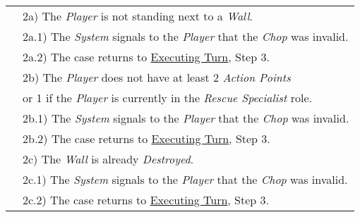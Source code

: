 \documentclass{article}
\begin{document}
	\begin{tabular}{l l}
		&2a) The \textit{Player} is not standing next to a \textit{Wall}.\\
		&\qquad2a.1) The \textit{System} signals to the \textit{Player} that the \textit{Chop} was invalid.\\ 
		&\qquad2a.2) The case returns to \underline{Executing Turn}, Step 3.\\
		&2b) The \textit{Player} does not have at least 2 \textit{Action Points}\\
		&\qquad or 1 if the \textit{Player} is currently in the \textit{Rescue Specialist} role.\\ 
		&\qquad2b.1) The \textit{System} signals to the \textit{Player} that the \textit{Chop} was invalid.\\ 
		&\qquad2b.2) The case returns to \underline{Executing Turn}, Step 3.\\
		&2c) The \textit{Wall} is already \textit{Destroyed}.\\ 
		&\qquad2c.1) The \textit{System} signals to the \textit{Player} that the \textit{Chop} was invalid.\\ 
		&\qquad2c.2) The case returns to \underline{Executing Turn}, Step 3.\\
	\end{tabular}
	
	
\end{document}
